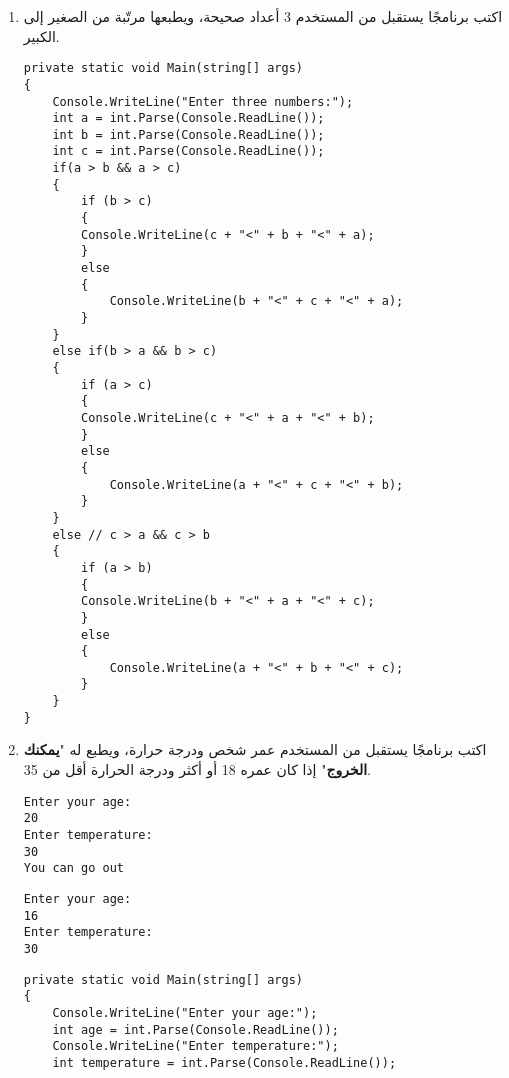 \documentclass[12pt, twoside]{article}
\begin{document}
\begin{enumerate}[itemsep=3em]
\begin{enumerate}
\item اكتب برنامجًا يستقبل من المستخدم 3 أعداد صحيحة، ويطبعها مرتّبة من الصغير إلى الكبير.

\ifdetailed
\ifwithsols
\begin{boxSolution}
\begin{english}
\begin{verbatim}
private static void Main(string[] args)
{
    Console.WriteLine("Enter three numbers:");
    int a = int.Parse(Console.ReadLine());
    int b = int.Parse(Console.ReadLine());
    int c = int.Parse(Console.ReadLine());
    if(a > b && a > c)
    {
        if (b > c)
        {
        Console.WriteLine(c + "<" + b + "<" + a);
        }
        else
        {
            Console.WriteLine(b + "<" + c + "<" + a);
        }
    }
    else if(b > a && b > c)
    {
        if (a > c)
        {
        Console.WriteLine(c + "<" + a + "<" + b);
        }
        else
        {
            Console.WriteLine(a + "<" + c + "<" + b);
        }
    }
    else // c > a && c > b
    {
        if (a > b)
        {
        Console.WriteLine(b + "<" + a + "<" + c);
        }
        else
        {
            Console.WriteLine(a + "<" + b + "<" + c);
        }
    }
}
\end{verbatim}
\end{english}
\end{boxSolution}
\fi
\clearpage
\fi

\item
اكتب برنامجًا يستقبل من المستخدم عمر شخص ودرجة حرارة، ويطبع له "\textbf{يمكنك الخروج}" إذا كان عمره 18 أو أكثر ودرجة الحرارة أقل من 35.
\ifdetailed
\begin{boxExample}[1]
\begin{english}
\begin{verbatim}
Enter your age:
20
Enter temperature:
30
You can go out
\end{verbatim}
\end{english}
\end{boxExample}
\begin{boxExample}[2]
\begin{english}
\begin{verbatim}
Enter your age:
16
Enter temperature:
30
\end{verbatim}
\end{english}
\end{boxExample}

\ifwithsols
\begin{boxSolution}
\begin{english}
\begin{verbatim}
private static void Main(string[] args)
{
    Console.WriteLine("Enter your age:");
    int age = int.Parse(Console.ReadLine());
    Console.WriteLine("Enter temperature:");
    int temperature = int.Parse(Console.ReadLine());


\end{verbatim}
\end{english}
\end{boxSolution}
\end{enumerate}
\end{enumerate}
\end{document}
